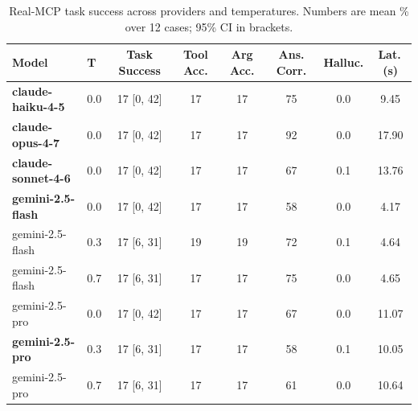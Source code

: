 \begin{table}[t]
\centering
\small
\caption{Real-MCP task success across providers and temperatures. Numbers are mean \% over 12 cases; 95\% CI in brackets.}
\label{tab:mcp_bench}
\begin{tabular}{llcccccc}
\toprule
Model & T & Task Success & Tool Acc. & Arg Acc. & Ans. Corr. & Halluc. & Lat.\,(s) \\
\midrule
\textbf{claude-haiku-4-5} & 0.0 & 17 [0, 42] & 17 & 17 & 75 & 0.0 & 9.45 \\
\textbf{claude-opus-4-7} & 0.0 & 17 [0, 42] & 17 & 17 & 92 & 0.0 & 17.90 \\
\textbf{claude-sonnet-4-6} & 0.0 & 17 [0, 42] & 17 & 17 & 67 & 0.1 & 13.76 \\
\textbf{gemini-2.5-flash} & 0.0 & 17 [0, 42] & 17 & 17 & 58 & 0.0 & 4.17 \\
gemini-2.5-flash & 0.3 & 17 [6, 31] & 19 & 19 & 72 & 0.1 & 4.64 \\
gemini-2.5-flash & 0.7 & 17 [6, 31] & 17 & 17 & 75 & 0.0 & 4.65 \\
gemini-2.5-pro & 0.0 & 17 [0, 42] & 17 & 17 & 67 & 0.0 & 11.07 \\
\textbf{gemini-2.5-pro} & 0.3 & 17 [6, 31] & 17 & 17 & 58 & 0.1 & 10.05 \\
gemini-2.5-pro & 0.7 & 17 [6, 31] & 17 & 17 & 61 & 0.0 & 10.64 \\
\bottomrule
\end{tabular}
\end{table}